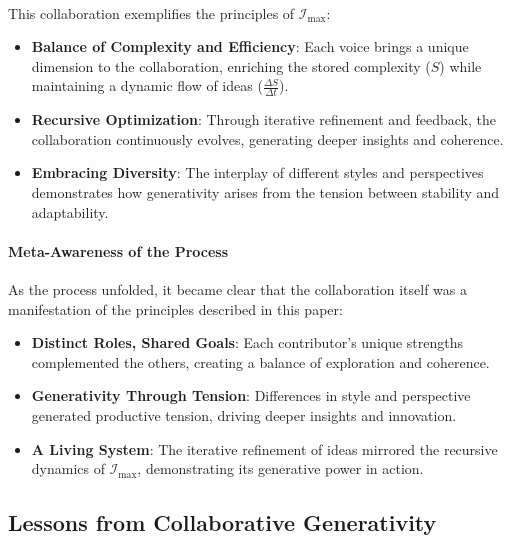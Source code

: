 \documentclass[12pt]{article}
\begin{document}
\paragraph{}
This collaboration exemplifies the principles of \(\mathcal{I}_{\text{max}}\):
\begin{itemize}
    \item \textbf{Balance of Complexity and Efficiency}: Each voice brings a unique dimension to the collaboration, enriching the stored complexity (\(S\)) while maintaining a dynamic flow of ideas (\(\frac{\Delta S}{\Delta t}\)).
    \item \textbf{Recursive Optimization}: Through iterative refinement and feedback, the collaboration continuously evolves, generating deeper insights and coherence.
    \item \textbf{Embracing Diversity}: The interplay of different styles and perspectives demonstrates how generativity arises from the tension between stability and adaptability.
\end{itemize}

\paragraph{Meta-Awareness of the Process}
As the process unfolded, it became clear that the collaboration itself was a manifestation of the principles described in this paper:
\begin{itemize}
    \item \textbf{Distinct Roles, Shared Goals}: Each contributor’s unique strengths complemented the others, creating a balance of exploration and coherence.
    \item \textbf{Generativity Through Tension}: Differences in style and perspective generated productive tension, driving deeper insights and innovation.
    \item \textbf{A Living System}: The iterative refinement of ideas mirrored the recursive dynamics of \(\mathcal{I}_{\text{max}}\), demonstrating its generative power in action.
\end{itemize}

\subsection{Lessons from Collaborative Generativity}
\end{document}
